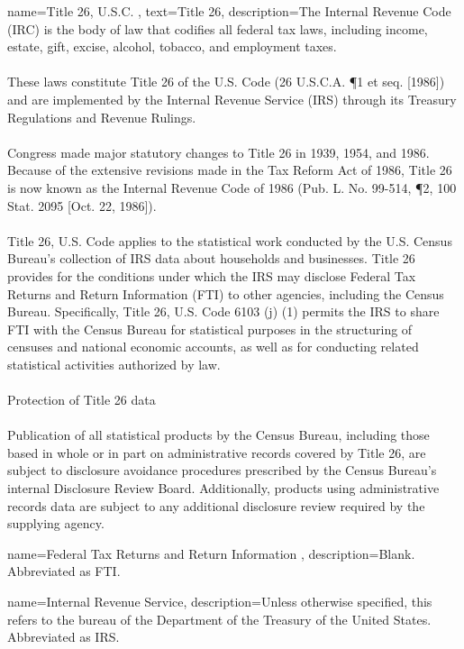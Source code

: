 {
name={Title 26, U.S.C.} ,
text={Title 26},
description={The Internal Revenue Code (IRC) is the body of law that codifies all federal tax laws, including income, estate, gift, excise, alcohol, tobacco, and employment taxes. \\
\\
These laws constitute Title 26 of the U.S. Code (26 U.S.C.A. \P 1 et seq. [1986]) and are implemented by the Internal Revenue Service (\gls{IRS}) through its Treasury Regulations and Revenue Rulings.\\
\\
Congress made major statutory changes to Title 26 in 1939, 1954, and 1986. Because of the extensive revisions made in the Tax Reform Act of 1986, Title 26 is now known as the Internal Revenue Code of 1986 (Pub. L. No. 99-514, \P 2, 100 Stat. 2095 [Oct. 22, 1986]).\\
\\
Title 26, U.S. Code applies to the statistical work conducted by the U.S. Census Bureau's collection of IRS data about households and businesses. Title 26 provides for the conditions under which the IRS may disclose Federal Tax Returns and Return Information (\gls{FTI}) to other agencies, including the Census Bureau. Specifically, Title 26, U.S. Code 6103 (j) (1) permits the IRS to share FTI with the Census Bureau for statistical purposes in the structuring of censuses and national economic accounts, as well as for conducting related statistical activities authorized by law.\\
\\
Protection of Title 26 data\\
\\
Publication of all statistical products by the Census Bureau, including those based in whole or in part on administrative records covered by Title 26, are subject to disclosure avoidance procedures prescribed by the Census Bureau's internal Disclosure Review Board. Additionally, products using administrative records data are subject to any additional disclosure review required by the supplying agency. \parencite{us_census_bureau_title_nodate}}
}

{
name={Federal Tax Returns and Return Information },
description={Blank. Abbreviated as FTI.}
}

{
  name={Internal Revenue Service},
  description={Unless otherwise specified, this refers to the bureau of
    the Department of the Treasury of the United States. Abbreviated as IRS.}
}

